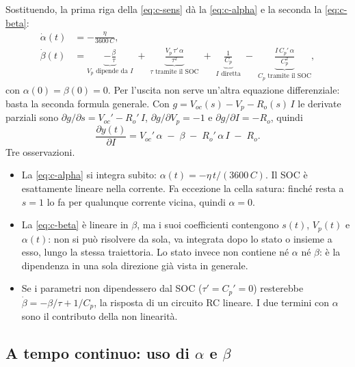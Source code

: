 \documentclass[11pt,a4paper]{article}
\begin{document}
Sostituendo, la prima riga della \eqref{eq:c-sens} dà la \eqref{eq:c-alpha} e
la seconda la \eqref{eq:c-beta}:
\begin{align}
  \dot\alpha(t) &= -\frac{\eta}{3600\,C} ,
     \tag{C6}\label{eq:c-alpha}\\
  \dot\beta(t) &=
      \underbrace{-\frac{\beta}{\tau}}_{V_p \text{ dipende da } I}
      \;+\; \underbrace{\frac{V_p\,\tau'\,\alpha}{\tau^2}}_{\tau \text{ tramite il SOC}}
      \;+\; \underbrace{\frac{1}{C_p}}_{I \text{ diretta}}
      \;-\; \underbrace{\frac{I\,C_p'\,\alpha}{C_p^2}}_{C_p \text{ tramite il SOC}} ,
     \tag{C7}\label{eq:c-beta}
\end{align}
con $\alpha(0) = \beta(0) = 0$. Per l'uscita non serve un'altra equazione
differenziale: basta la seconda formula generale. Con
$g = V_{oc}(s) - V_p - R_o(s)\,I$ le derivate parziali sono
$\partial g/\partial s = V_{oc}' - R_o'\,I$,
$\partial g/\partial V_p = -1$ e $\partial g/\partial I = -R_o$, quindi
\begin{equation}
  \frac{\partial y(t)}{\partial I}
    = V_{oc}'\,\alpha \;-\; \beta \;-\; R_o'\,\alpha\,I \;-\; R_o .
  \tag{C8}\label{eq:c-dy}
\end{equation}
Tre osservazioni.
\begin{itemize}
  \item La \eqref{eq:c-alpha} si integra subito: $\alpha(t) = -\eta\,t/(3600\,C)$.
        Il SOC è esattamente lineare nella corrente. Fa eccezione la cella
        satura: finché resta a $s = 1$ lo fa per qualunque corrente vicina,
        quindi $\alpha = 0$.
  \item La \eqref{eq:c-beta} è lineare in $\beta$, ma i suoi coefficienti
        contengono $s(t)$, $V_p(t)$ e $\alpha(t)$: non si può risolvere da
        sola, va integrata dopo lo stato o insieme a esso, lungo la stessa
        traiettoria. Lo stato invece non contiene né $\alpha$ né $\beta$: è la
        dipendenza in una sola direzione già vista in generale.
  \item Se i parametri non dipendessero dal SOC ($\tau' = C_p' = 0$)
        resterebbe $\dot\beta = -\beta/\tau + 1/C_p$, la risposta di un
        circuito RC lineare. I due termini con $\alpha$ sono il contributo
        della non linearità.
\end{itemize}

\subsection{A tempo continuo: uso di $\alpha$ e $\beta$}\label{sec:uso}
\end{document}
